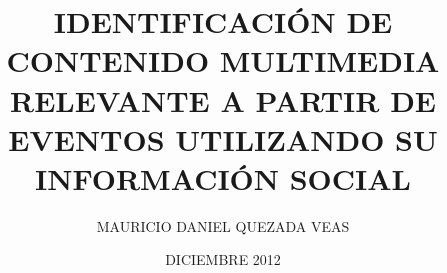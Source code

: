 \documentclass[upright, contnum]{umemoria}
\author{MAURICIO DANIEL QUEZADA VEAS}
\title{IDENTIFICACI\'ON DE CONTENIDO MULTIMEDIA RELEVANTE A PARTIR DE EVENTOS UTILIZANDO SU INFORMACI\'ON SOCIAL}
\date{DICIEMBRE 2012}
\begin{document}
\frontmatter
\maketitle

\begin{abstract}
\lipsum[1-4]
\end{abstract}



\cleardoublepage
\begin{spacing}{1.5}
\tableofcontents
\end{spacing}
\listoffigures

\mainmatter







\nocite{*}




\end{document}

